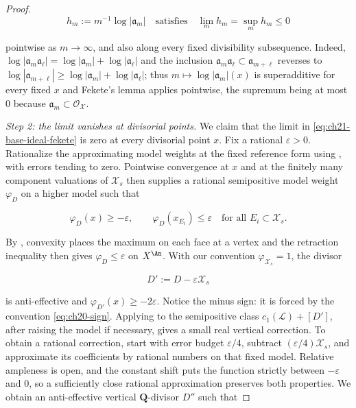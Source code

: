 \begin{proof}
\begin{equation}
\label{eq:ch21-base-ideal-fekete}
 h_m:=m^{-1}\log|\mathfrak a_m|
 \quad\text{satisfies}\quad
 \lim_m h_m=\sup_m h_m\leq0
\end{equation}

pointwise as $m\to\infty$, and also along every fixed divisibility
subsequence.
Indeed, $\log|\mathfrak a_m\mathfrak a_\ell|=
\log|\mathfrak a_m|+\log|\mathfrak a_\ell|$ and the inclusion
$\mathfrak a_m\mathfrak a_\ell\subset\mathfrak a_{m+\ell}$ reverses to
$\log|\mathfrak a_{m+\ell}|\geq
\log|\mathfrak a_m|+\log|\mathfrak a_\ell|$; thus
$m\mapsto\log|\mathfrak a_m|(x)$ is superadditive for every fixed $x$
and Fekete's lemma applies pointwise, the supremum being at most $0$
because $\mathfrak a_m\subset\mathcal O_{\mathcal X}$.

\emph{Step 2: the limit vanishes at divisorial points.}
We claim that the limit in \eqref{eq:ch21-base-ideal-fekete} is zero at
every divisorial point $x$.  Fix a
rational $\varepsilon>0$.  Rationalize the approximating model weights
at the fixed reference form using
, with errors tending to
zero.  Pointwise convergence at $x$ and at the finitely many component
valuations of $\mathcal X_s$ then supplies a rational semipositive model
weight $\varphi_D$ on a higher model such that

\begin{equation}
\label{eq:ch21-closedness-finite-values}
       \varphi_D(x)\geq-\varepsilon,
       \qquad
       \varphi_D(x_{E_i})\leq\varepsilon
       \quad\text{for all }E_i\subset\mathcal X_s.
\end{equation}

By , convexity places the maximum
on each face at a vertex and the retraction inequality then gives
$\varphi_D\leq\varepsilon$ on $X^{\An}$.  With our convention
$\varphi_{\mathcal X_s}=1$, the divisor

\[
                         D':=D-\varepsilon\mathcal X_s
\]

is anti-effective and
$\varphi_{D'}(x)\geq-2\varepsilon$.  Notice the minus sign: it is forced by
the convention \eqref{eq:ch20-sign}.  Applying
 to the semipositive class
$c_1(\mathcal L)+[D']$, after raising the model if necessary, gives a
small real vertical correction.  To obtain a rational correction,
start with error budget $\varepsilon/4$, subtract
$(\varepsilon/4)\mathcal X_s$, and approximate its coefficients by
rational numbers on that fixed model.  Relative ampleness is open, and
the constant shift puts the function strictly between $-\varepsilon$ and
$0$, so a sufficiently close rational approximation preserves both
properties.  We obtain an anti-effective vertical $\mathbf Q$-divisor
$D''$ such that


\end{proof}
